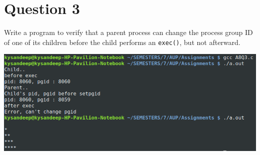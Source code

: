 \documentclass[main.tex]{subfiles}
\begin{document}
\section{Question 3}
Write a program to verify that a parent process can change the process group ID
of one of its children before the child performs an \texttt{exec()}, but not afterward.


\includegraphics[width=\textwidth]{figures/3_output.png}
\end{document}
